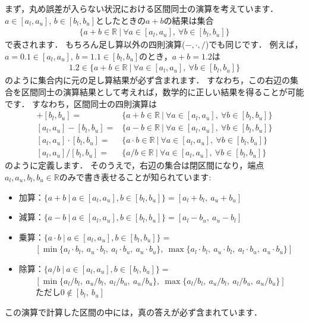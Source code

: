 まず，丸め誤差が入らない状況における区間同士の演算を考えています．
$a \in[a_l, a_u]$, $b \in [b_l, b_u]$としたときの$a + b$の結果は集合
\begin{align*}
	\{ a + b \in {\mathbb R} ~ | ~ \forall a \in [a_l, a_u], ~ \forall b \in [b_l, b_u] \}
\end{align*}
で表されます．
もちろん足し算以外の四則演算($-, \cdot, /$)でも同じです．
例えば，$a = 0.1 \in[a_l, a_u]$, $b = 1.1 \in [b_l, b_u]$のとき，$a + b = 1.2$は
\begin{align*}
	1.2 \in \{ a + b \in {\mathbb R} ~ | ~ \forall a \in [a_l, a_u], ~ \forall b \in [b_l, b_u] \}
\end{align*}
のように集合内に元の足し算結果が必ず含まれます．
すなわち，この右辺の集合を区間同士の演算結果として考えれば，数学的に正しい結果を得ることが可能です．
すなわち，区間同士の四則演算は
\begin{align*}
	[a_l, a_u] + [b_l, b_u] =& \{ a + b \in {\mathbb R} ~ | ~  \forall a \in [a_l, a_u], ~ \forall b \in [b_l, b_u]  \} \\
	[a_l, a_u] - [b_l, b_u] =& \{ a - b \in {\mathbb R} ~ | ~  \forall a \in [a_l, a_u], ~ \forall b \in [b_l, b_u]  \} \\
	[a_l, a_u] \cdot [b_l, b_u] =& \{ a \cdot b \in {\mathbb R} ~ | ~  \forall a \in [a_l, a_u], ~ \forall b \in [b_l, b_u]  \} \\
	[a_l, a_u] / [b_l, b_u] =& \{ a / b \in {\mathbb R} ~ | ~  \forall a \in [a_l, a_u], ~ \forall b \in [b_l, b_u]  \}
\end{align*}
のように定義します．
そのうえで，右辺の集合は閉区間になり，端点$a_l, a_u, b_l, b_u \in {\mathbb R}$のみで書き表せることが知られています:
\begin{itemize}
	\item 加算：$ \{ a + b ~ | ~a \in [a_l, a_u], b \in [b_l, b_u] \} = [a_l + b_l, \ a_u + b_u]$
	\item 減算：$ \{ a - b ~ | ~a \in [a_l, a_u], b \in [b_l, b_u] \} = [a_l - b_u,\ a_u - b_l]$
	
	\item 乗算：$ \{ a \cdot b ~ | ~a \in [a_l, a_u], b \in [b_l, b_u] \} = $\\
	$ ~~~~~~~~~ [\min \{ a_l \cdot b_l, ~ a_u \cdot b_l, ~ a_l \cdot b_u, ~ a_u \cdot b_u \}, ~ \max \{ a_l \cdot b_l, ~ a_u \cdot b_l, ~ a_l \cdot b_u, ~ a_u \cdot b_u \} ]$
	\item 除算：$ \{ a / b ~ | ~a \in [a_l, a_u], b \in [b_l, b_u] \} = $\\
	$ ~~~~~~~~~ [\min \{ a_l / b_l, ~ a_u / b_l, ~ a_l / b_u, ~ a_u / b_u \}, ~ \max \{ a_l / b_l, ~ a_u / b_l, ~ a_l / b_u, ~ a_u / b_u \} ]$\\
	$ ~~~~~~~~~ $ただし$0 \notin [b_l,\ b_u]$
\end{itemize}
この演算で計算した区間の中には，真の答えが必ず含まれています．




